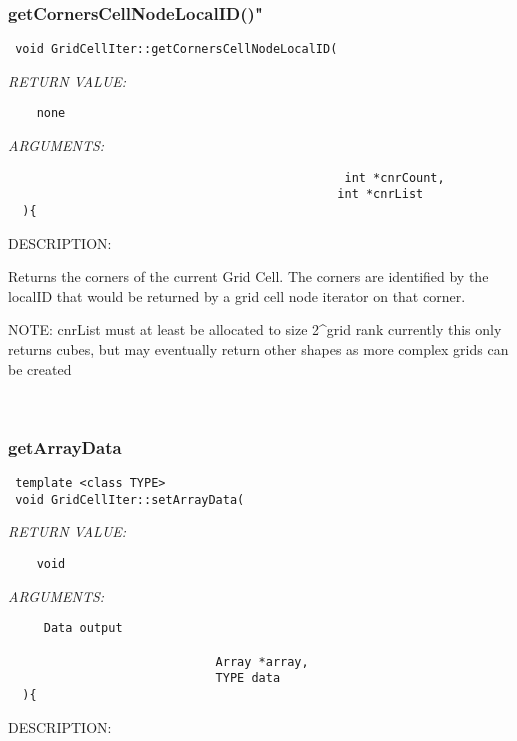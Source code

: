 \subsubsection [getCornersCellNodeLocalID()"] {getCornersCellNodeLocalID()"}


  
\begin{verbatim} void GridCellIter::getCornersCellNodeLocalID(\end{verbatim}{\em RETURN VALUE:}
\begin{verbatim}    none\end{verbatim}{\em ARGUMENTS:}
\begin{verbatim}                                               int *cnrCount,
                                              int *cnrList
  ){\end{verbatim}
{\sf DESCRIPTION:\\ }


     Returns the corners of the current Grid Cell. The corners
   are identified by the localID that would be returned by
   a grid cell node iterator on that corner. 
  
   NOTE: cnrList must at least be allocated to size 2^grid rank
         currently this only returns cubes, but may eventually
         return other shapes as more complex grids can be created
   
 
\mbox{}\hrulefill\
 
\subsubsection [getArrayData] {getArrayData}


  
\begin{verbatim} template <class TYPE>
 void GridCellIter::setArrayData(\end{verbatim}{\em RETURN VALUE:}
\begin{verbatim}    void\end{verbatim}{\em ARGUMENTS:}
\begin{verbatim}     Data output
   
                             Array *array,
                             TYPE data 
  ){\end{verbatim}
{\sf DESCRIPTION:\\ }


